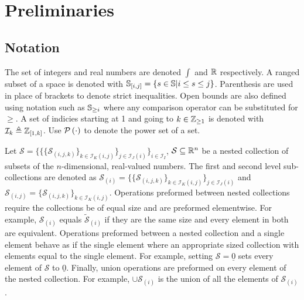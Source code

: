 \section{Preliminaries}
\subsection{Notation}
The set of integers and real numbers are denoted $\int$ and $\mathbb{R}$ respectively. A ranged subset of a space is denoted with $\mathbb{S}_{[i,j]}=\{s\in\mathbb{S}|i\leq s\leq j\}$. Parenthesis are used in place of brackets to denote strict inequalities. Open bounds are also defined using notation such as $\mathbb{S}_{\geq i}$ where any comparison operator can be substituted for $\geq$. A set of indicies starting at 1 and going to $k\in\mathbb{Z}_{\geq 1}$ is denoted with $\mathcal{I}_{k}\triangleq\mathbb{Z}_{[1,k]}$. Use $\mathcal{P}\left(\cdot\right)$ to denote the power set of a set. 

Let $\mathcal{S}=\{\{\{\mathcal{S}_{(i,j,k)}\}_{k\in\mathcal{I}_{K}(i,j)}\}_{j\in\mathcal{I}_{J}(i)}\}_{i\in\mathcal{I}_I}$, $\mathcal{S}\subseteq\mathbb{R}^n$ be a nested collection of subsets of the $n$-dimensional, real-valued numbers. The first and second level sub-collections are denoted as $\mathcal{S}_{(i)}=\{\{\mathcal{S}_{(i,j,k)}\}_{k\in\mathcal{I}_{K}(i,j)}\}_{j\in\mathcal{I}_{J}(i)}$ and $\mathcal{S}_{(i,j)}=\{\mathcal{S}_{(i,j,k)}\}_{k\in\mathcal{I}_{K}(i,j)}$. Operations preformed between nested collections require the collections be of equal size and are preformed elementwise. For example, $\mathcal{S}_{(i)}$ equals $\tilde{\mathcal{S}}_{(i)}$ if they are the same size and every element in both are equivalent. Operations preformed between a nested collection and a single element behave as if the single element where an appropriate sized collection with elements equal to the single element. For example, setting $\mathcal{S}=\underline{0}$ sets every element of $\mathcal{S}$ to $\underline{0}$. Finally, union operations are preformed on every element of the nested collection. For example, $\cup \mathcal{S}_{(i)}$ is the union of all the elements of $\mathcal{S}_{(i)}$.

